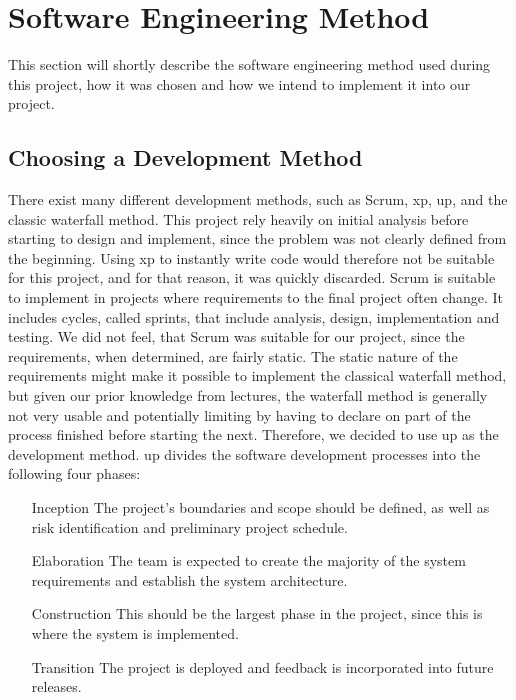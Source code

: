 \section{Software Engineering Method}
\label{sec:software_engineering_method}
This section will shortly describe the software engineering method used during this project, how it was chosen and how we intend to implement it into our project.

\subsection{Choosing a Development Method}
There exist many different development methods, such as Scrum, \ac{xp}, \ac{up}, and the classic waterfall method.
This project rely heavily on initial analysis before starting to design and implement, since the problem was not clearly defined from the beginning.
Using \ac{xp} to instantly write code would therefore not be suitable for this project, and for that reason, it was quickly discarded.
Scrum is suitable to implement in projects where requirements to the final project often change.
It includes cycles, called sprints, that include analysis, design, implementation and testing.
We did not feel, that Scrum was suitable for our project, since the requirements, when determined, are fairly static.
The static nature of the requirements might make it possible to implement the classical waterfall method, but given our prior knowledge from lectures, the waterfall method is generally not very usable and potentially limiting by having to declare on part of the process finished before starting the next.
Therefore, we decided to use \ac{up} as the development method.
\ac{up} divides the software development processes into the following four phases: 

\begin{itemize}
\item[Inception] The project's boundaries and scope should be defined, as well as risk identification and preliminary project schedule.
\item[Elaboration] The team is expected to create the majority of the system requirements and establish the system architecture.
\item[Construction] This should be the largest phase in the project, since this is where the system is implemented.
\item[Transition] The project is deployed and feedback is incorporated into future releases.
\end{itemize}

